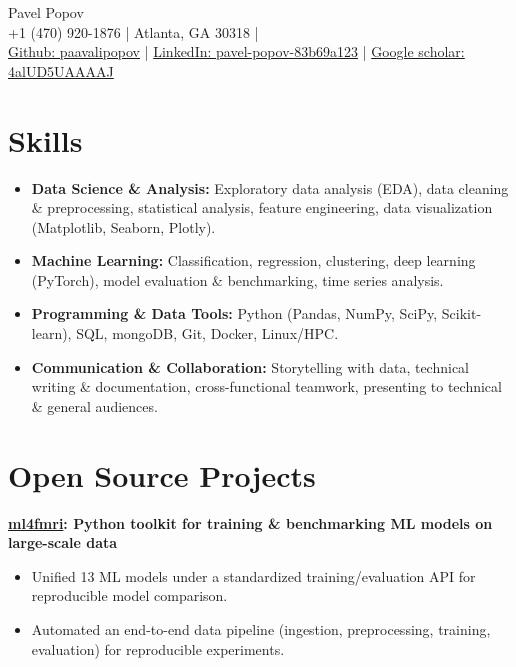 \documentclass[11pt,a4paper]{article}
\begin{document}
\begin{center}
  {\Huge Pavel Popov}\\[0.5em]
  {\footnotesize +1 (470) 920-1876 \quad | \quad Atlanta, GA 30318} \quad | \\
  {\small \href{https://github.com/paavalipopov}{Github: paavalipopov} \quad | \quad
  \href{https://www.linkedin.com/in/pavel-popov-83b69a123/}{LinkedIn: pavel-popov-83b69a123} \quad | \quad
  \href{https://scholar.google.com/citations?user=4alUD5UAAAAJ}{Google scholar: 4alUD5UAAAAJ}}
\end{center}

\section*{Skills}
\begin{itemize}
[leftmargin=*,noitemsep]
\item \textbf{Data Science \& Analysis:} Exploratory data analysis (EDA), data cleaning \& preprocessing, statistical analysis, feature engineering, data visualization (Matplotlib, Seaborn, Plotly).
\item \textbf{Machine Learning:} Classification, regression, clustering, deep learning (PyTorch), model evaluation \& benchmarking, time series analysis.
\item \textbf{Programming \& Data Tools:} Python (Pandas, NumPy, SciPy, Scikit-learn), SQL, mongoDB, Git, Docker, Linux/HPC.
\item \textbf{Communication \& Collaboration:} Storytelling with data, technical writing \& documentation, cross-functional teamwork, presenting to technical \& general audiences.
\end{itemize}

\section*{Open Source Projects}
\noindent\textbf{\href{https://pypi.org/project/ml4fmri/}{ml4fmri}: Python toolkit for training \& benchmarking ML models on large-scale data}\\
[-2em]
\begin{itemize}[leftmargin=*,noitemsep]
    \item Unified 13 ML models under a standardized training/evaluation API for reproducible model comparison.
    \item Automated an end-to-end data pipeline (ingestion, preprocessing, training, evaluation) for reproducible experiments.
\end{itemize}
\end{document}
